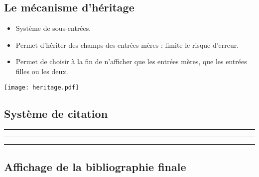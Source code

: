 \subsection{Le mécanisme d'héritage}

\begin{slide}
  \begin{itemize}
    \item Système de sous-entrées.
    \item Permet d'hériter des champs des entrées mères : limite le risque d'erreur.
    \item Permet de choisir à la fin de n'afficher que les entrées mères, que les entrées filles ou les deux.
\end{itemize}
\end{slide}

\begin{slide}
 \centering
 \texttt{[image: heritage.pdf]}

 \cite{Maraval1998}
\end{slide}

\subsection{Système de citation}

\begin{slide}
  \beamerdefaultoverlayspecification{} 

  \cite{BHG226}
  \hrule


  \cite[(3)630]{Pleiade_Barnabe}

  \hrule
  


  \cite[(1)629]{Pleiade_Barnabe}
  

  \hrule


  \cite{BHG226}

\end{slide}
\subsection{Affichage de la bibliographie finale}
\begin{slide}
  \tiny
  \inputminted{latex}{examples/biblio-finale.tex}
\end{slide}
